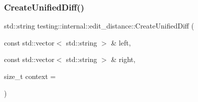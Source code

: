 \subsubsection{\texorpdfstring{CreateUnifiedDiff()}{CreateUnifiedDiff()}}
{\footnotesize\ttfamily std\+::string testing\+::internal\+::edit\+\_\+distance\+::\+Create\+Unified\+Diff (\begin{DoxyParamCaption}\item[{const std\+::vector$<$ std\+::string $>$ \&}]{left,  }\item[{const std\+::vector$<$ std\+::string $>$ \&}]{right,  }\item[{size\+\_\+t}]{context = {} }\end{DoxyParamCaption})}

